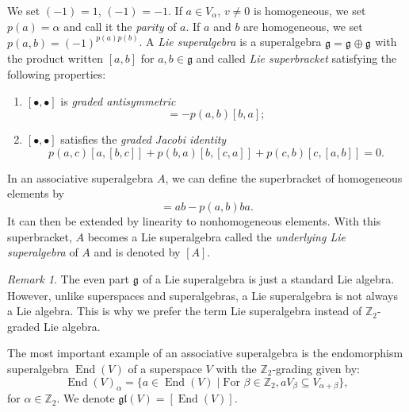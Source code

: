 \documentclass[a4paper, 12pt, reqno]{amsart}
\theoremstyle{remark}
\newtheorem{remark}[theorem]{Remark}
\numberwithin{equation}{subsection}
\DeclareMathOperator{\End}{End}
\DeclareMathOperator{\zero}{\overline{0}}
\DeclareMathOperator{\one}{\overline{1}}
\begin{document}
We set $(-1)^{\zero} = 1$, $(-1)^{\one} = -1$.
If $a\in V_\alpha$, $v\neq 0$ is homogeneous, we set $p(a) = \alpha$ and call it the \emph{parity} of $a$.
If $a$ and $b$ are homogeneous, we set $p(a, b) = (-1)^{p(a)p(b)}$.
A \emph{Lie superalgebra} is a superalgebra $\mathfrak{g} = \mathfrak{g}_{\zero} \oplus \mathfrak{g}_{\one}$ with the product written $[a, b]$ for $a, b \in \mathfrak{g}$ and called \emph{Lie superbracket} satisfying the following properties:
\begin{enumerate}
\item $[\bullet, \bullet]$ is \emph{graded antisymmetric}
  \begin{equation*}
    [a, b] = -p(a, b)[b, a];
  \end{equation*}
\item $[\bullet, \bullet]$ satisfies the \emph{graded Jacobi identity}
  \begin{equation*}
    p(a, c)[a, [b, c]] + p(b, a)[b, [c, a]] + p(c, b)[c, [a, b]] = 0.
  \end{equation*}
\end{enumerate}

In an associative superalgebra $A$, we can define the superbracket of homogeneous elements by
\begin{equation*}
  [a, b] = ab - p(a, b)ba.
\end{equation*}
It can then be extended by linearity to nonhomogeneous elements.
With this superbracket, $A$ becomes a Lie superalgebra called the \emph{underlying Lie superalgebra} of $A$ and is denoted by $[A]$.

\begin{remark}
  \label{rmk:1}
  The even part $\mathfrak{g}_{\zero}$ of a Lie superalgebra is just a standard Lie algebra.
  However, unlike superspaces and superalgebras, a Lie superalgebra is not always a Lie algebra.
  This is why we prefer the term Lie superalgebra instead of $\mathbb{Z}_2$-graded Lie algebra.
\end{remark}

The most important example of an associative superalgebra is the endomorphism superalgebra $\End(V)$ of a superspace $V$ with the $\mathbb{Z}_2$-grading given by:
\begin{equation*}
  \End(V)_{\alpha} = \{a \in \End(V) \mid \text{For }\beta \in \mathbb{Z}_2, aV_\beta \subseteq V_{\alpha + \beta}\},
\end{equation*}
for $\alpha \in \mathbb{Z}_2$.
We denote $\mathfrak{gl}(V) = [\End(V)]$.
\end{document}

